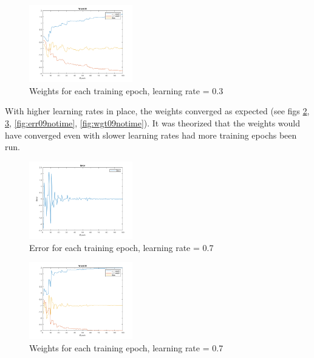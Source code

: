 \documentclass{IEEEtran}
\begin{document}
\begin{centering}
\begin{figure}
\begin{center}
	\includegraphics[width=0.4\textwidth]{weights_notime_03lr}
	\caption{Weights for each training epoch, learning rate = 0.3\label{fig:wgt03notime}}
\end{center}
\end{figure}
\end{centering}

With higher learning rates in place, the weights converged as expected (see figs \ref{fig:err07notime}, \ref{fig:wgt07notime}, \ref{fig:err09notime}, \ref{fig:wgt09notime}). It was theorized that the weights would have converged even with slower learning rates had more training epochs been run.

\begin{centering}
\begin{figure}
\begin{center}
	\includegraphics[width=0.4\textwidth]{error_notime_07lr}
	\caption{Error for each training epoch, learning rate = 0.7\label{fig:err07notime}}
\end{center}
\end{figure}
\end{centering}

\begin{centering}
\begin{figure}
\begin{center}
	\includegraphics[width=0.4\textwidth]{weights_notime_07lr}
	\caption{Weights for each training epoch, learning rate = 0.7\label{fig:wgt07notime}}
\end{center}
\end{figure}
\end{centering}
\end{document}
